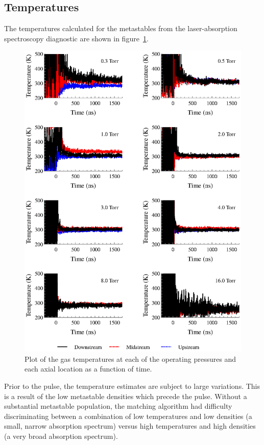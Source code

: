 \subsection{Temperatures}

The temperatures calculated for the metastables from the laser-absorption
spectroscopy diagnostic are shown in figure~\ref{fig:temperatures}.
\begin{figure}
  \centering
  \includegraphics{./chapters/metastables/figures/temperatures.eps}
  \caption{Plot of the gas temperatures at each of the operating
  pressures and each axial location as a function of time.}
  \label{fig:temperatures}
\end{figure}
Prior to the pulse, the temperature estimates are subject to large variations.
This is a result of the low metastable densities which precede the pulse.
Without a substantial metastable population, the matching algorithm had
difficulty discriminating between a combination of low temperatures and low
densities (a small, narrow absorption spectrum) versus high temperatures and
high densities (a very broad absorption spectrum).

